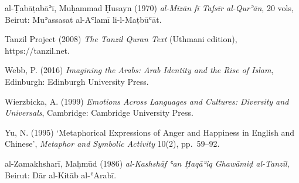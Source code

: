 \documentclass[11pt,a4paper]{article}
\begin{document}
al-Ṭabāṭabāʾī, Muḥammad Ḥusayn (1970) \emph{al-Mīzān fī Tafsīr
al-Qurʾān}, 20 vols, Beirut: Muʾassasat al-Aʿlamī li-l-Maṭbūʿāt.

Tanzil Project (2008) \emph{The Tanzil Quran Text} (Uthmani edition),
https://tanzil.net.

Webb, P. (2016) \emph{Imagining the Arabs: Arab Identity and the Rise of
Islam}, Edinburgh: Edinburgh University Press.

Wierzbicka, A. (1999) \emph{Emotions Across Languages and Cultures:
Diversity and Universals}, Cambridge: Cambridge University Press.

Yu, N. (1995) `Metaphorical Expressions of Anger and Happiness in
English and Chinese', \emph{Metaphor and Symbolic Activity} 10(2),
pp.~59--92.

al-Zamakhsharī, Maḥmūd (1986) \emph{al-Kashshāf ʿan Ḥaqāʾiq Ghawāmiḍ
al-Tanzīl}, Beirut: Dār al-Kitāb al-ʿArabī.
\end{document}

